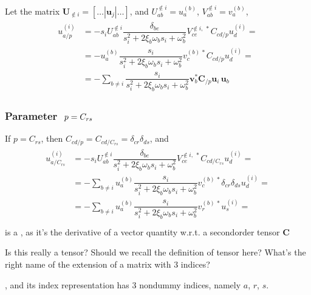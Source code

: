 \documentclass[letterpaper,10pt,english]{jupyterBook}
\begin{document}
\sphinxAtStartPar
Let the matrix \(\mathbf{U}_{\notin i} = \left[ \dots | \mathbf{u}_j | \dots \right]\), and \(U_{ab}^{\notin i} = u^{(b)}_a\), \(V_{ab}^{\notin i} = v^{(b)}_a\),
\begin{equation*}
\begin{split}\begin{aligned}
  u^{(i)}_{a/p}
  & = - s_i U^{\notin i}_{ab} \dfrac{\delta_{be}}{s_i^2 + 2 \xi_b \omega_b s_i + \omega_b^2} V^{\notin i, \ *}_{ce} C_{cd/p} u^{(i)}_d = \\
  & = - u^{(b)}_a \dfrac{s_i}{s_i^2 + 2 \xi_b \omega_b s_i + \omega_b^2} v^{(b) \, *}_{c} C_{cd/p} u_d^{(i)} = \\
  & = - \sum_{b \ne i} \dfrac{s_i}{s_i^2 + 2 \xi_b \omega_b s_i + \omega_b^2} \mathbf{v}_b^* \mathbf{C}_{/p} \mathbf{u}_i \, \mathbf{u}_b
\end{aligned}\end{split}
\end{equation*}\subsubsection*{Parameter \protect\(\ p = C_{rs}\protect\)}

\sphinxAtStartPar
If \(p = C_{rs}\), then \(C_{cd/p} = C_{cd/C_{rs}} = \delta_{cr} \delta_{ds}\), and
\begin{equation*}
\begin{split}\begin{aligned}
  u^{(i)}_{a/C_{rs}}
  & = - s_i U^{\notin i}_{ab} \dfrac{\delta_{be}}{s_i^2 + 2 \xi_b \omega_b s_i + \omega_b^2} V^{\notin i, \ *}_{ce} C_{cd/C_{rs}} u^{(i)}_d = \\
  & = - \sum_{b \ne i} u^{(b)}_a \dfrac{s_i}{s_i^2 + 2 \xi_b \omega_b s_i + \omega_b^2} v^{(b) \, *}_{c} \delta_{cr} \delta_{ds} u_d^{(i)} = \\
  & = - \sum_{b \ne i} u^{(b)}_a \dfrac{s_i}{s_i^2 + 2 \xi_b \omega_b s_i + \omega_b^2} v^{(b) \, *}_{r} u_s^{(i)} = \\
\end{aligned}\end{split}
\end{equation*}
\sphinxAtStartPar
is a , as it’s the derivative of a vector quantity w.r.t. a second\sphinxhyphen{}order tensor \(\mathbf{C}\)%
\begin{footnote}[1]\sphinxAtStartFootnote
Is this really a tensor? Should we recall the definition of tensor here? What’s the right name of the extension of a matrix with 3 indices?
%
\end{footnote}, and its index representation has 3 non\sphinxhyphen{}dummy indices, namely \(a\), \(r\), \(s\).
\end{document}
